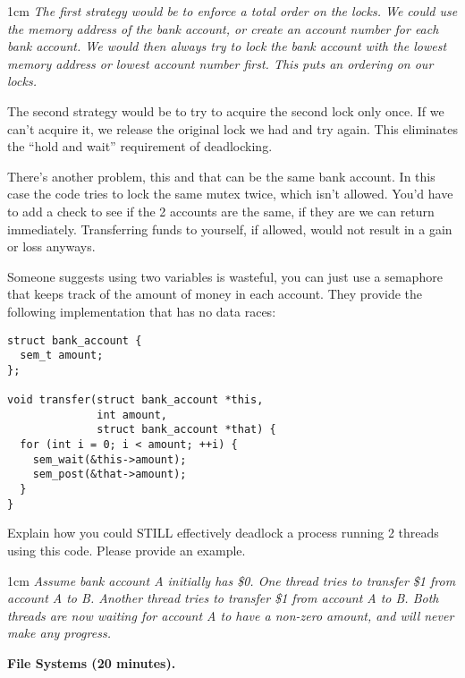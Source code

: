 \documentclass[12pt]{article}
\newenvironment{answer}{\begin{adjustwidth}{1cm}{}\itshape}{\end{adjustwidth}}
\begin{document}
\begin{answer}
  The first strategy would be to enforce a total order on the locks.
  We could use the memory address of the bank account, or create an account
  number for each bank account. We would then always try to lock the bank
  account with the lowest memory address or lowest account number first.
  This puts an ordering on our locks.

  The second strategy would be to try to acquire the second lock only once.
  If we can't acquire it, we release the original lock we had and try again.
  This eliminates the ``hold and wait'' requirement of deadlocking.

  There's another problem, this and that can be the same bank account.
  In this case the code tries to lock the same mutex twice, which isn't
  allowed. You'd have to add a check to see if the 2 accounts are the same,
  if they are we can return immediately. Transferring funds to yourself,
  if allowed, would not result in a gain or loss anyways.
\end{answer}

\newpage

Someone suggests using two variables is wasteful, you can just use a
semaphore that keeps track of the amount of money in each account.
They provide the following implementation that has no data races:

\begin{lstlisting}
struct bank_account {
  sem_t amount;
};

void transfer(struct bank_account *this,
              int amount,
              struct bank_account *that) {
  for (int i = 0; i < amount; ++i) {
    sem_wait(&this->amount);
    sem_post(&that->amount);
  }
}
\end{lstlisting}

Explain how you could STILL effectively deadlock a process running 2 threads
using this code. Please provide an example.

\begin{answer}
  Assume bank account A initially has \$0. One thread tries to transfer \$1
  from account A to B. Another thread tries to transfer \$1 from account A to
  B. Both threads are now waiting for account A to have a non-zero amount, and
  will never make any progress.
\end{answer}

\newpage

\textbf{File Systems (20 minutes).}

\vspace{1em}
\end{document}

